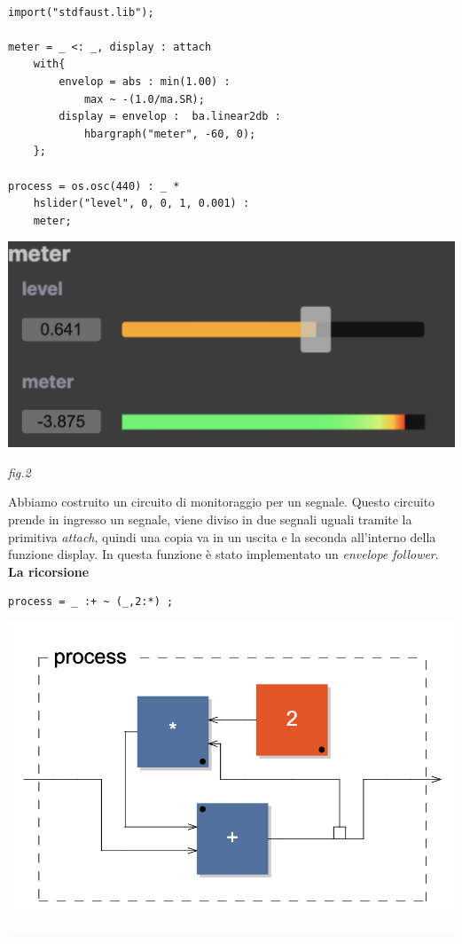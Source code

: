 \documentclass[11pt]{article}
\begin{document}
\begin{multicols*}{2}
\begin{Verbatim}[fontsize=\scriptsize]

import("stdfaust.lib");

meter = _ <: _, display : attach
    with{
        envelop = abs : min(1.00) : 
        	max ~ -(1.0/ma.SR);
        display = envelop :  ba.linear2db :
        	hbargraph("meter", -60, 0);
    };

process = os.osc(440) : _ * 
	hslider("level", 0, 0, 1, 0.001) : 
	meter;

\end{Verbatim}

\begin{center}
\includegraphics[scale=0.3]{img/06.png}

{\scriptsize \emph{fig.2 }}
\end{center}


Abbiamo costruito un circuito di monitoraggio per un segnale. Questo circuito prende in ingresso un segnale, viene diviso in due segnali uguali tramite la primitiva \textit{attach}, quindi una copia va in un uscita e la seconda all'interno della funzione display. In questa funzione è stato implementato un \textit{envelope follower}.\\

\textbf{La ricorsione}\\

\begin{Verbatim}[fontsize=\scriptsize]
process = _ :+ ~ (_,2:*) ;
\end{Verbatim}

\begin{center}
\includegraphics[scale=0.3]{img/02.png}


\end{center}
\end{multicols*}
\end{document}
